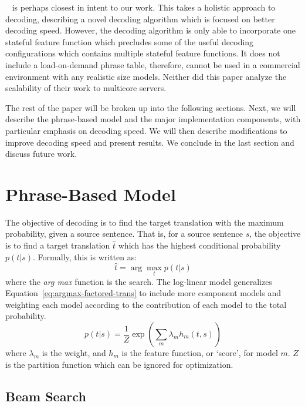 \documentclass[11pt]{article}
\begin{document}
~ is perhaps closest in intent to our work. This takes a holistic approach to decoding, describing a novel decoding algorithm which is focused on better decoding speed. However, the decoding algorithm is only able to incorporate one stateful feature function which precludes some of the useful decoding configurations which contains multiple stateful feature functions. It does not include a load-on-demand phrase table, therefore, cannot be used in a commercial environment with any realistic size models. Neither did this paper analyze the scalability of their work to multicore servers.

The rest of the paper will be broken up into the following sections. Next, we will describe the phrase-based model and the major implementation components, with particular emphasis on decoding speed. We will then describe modifications to improve decoding speed and present results. We conclude in the last section and discuss future work.

\section{Phrase-Based Model}

The objective of decoding is to find the target translation with the maximum probability, given a source sentence. That is, for a source sentence $s$, the objective is to find a target translation $\hat{t}$ which has the highest conditional probability $p(t | s)$. Formally, this is written as:
\begin{equation}
\hat{t} = \arg \max_t p( t | s )
\label{eq:argmax-factored-trans}
\end{equation}
where the \emph{arg max} function is the search. The log-linear model generalizes Equation~\ref{eq:argmax-factored-trans} to include more component models and weighting each model according to the contribution of each model to the total probability. 
\begin{equation}
\label{eq:Log-Linear}
p(t | s) 	=  \frac{1}{Z} \exp ( \sum_m \lambda_m h_m ( t, s)^{} )
\end{equation}
where $\lambda_m$ is the weight, and $h_m$ is the feature function, or `score', for model $m$. $Z$ is the partition function which can be ignored for optimization. 

\subsection{Beam Search}
\end{document}
